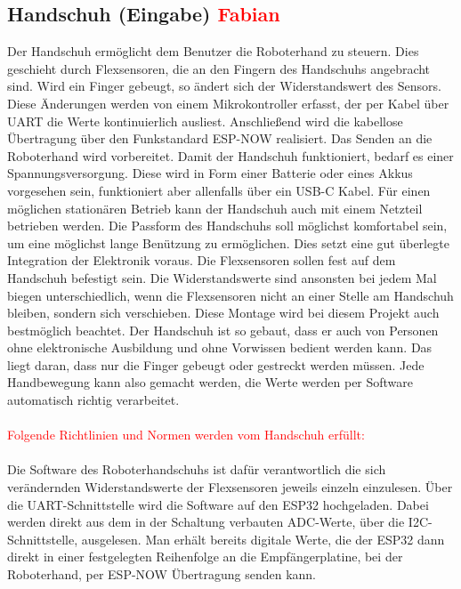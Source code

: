 \documentclass[11pt]{article}
\begin{document}
\subsection{Handschuh (Eingabe) \textcolor{red}{Fabian}}
Der Handschuh ermöglicht dem Benutzer die Roboterhand zu steuern. Dies geschieht durch Flexsensoren, die an den Fingern des 
Handschuhs angebracht sind. Wird ein Finger gebeugt, so ändert sich der Widerstandswert des Sensors. Diese Änderungen werden 
von einem Mikrokontroller erfasst, der per Kabel über UART die Werte kontinuierlich ausliest. Anschließend wird die kabellose 
Übertragung über den Funkstandard ESP-NOW realisiert. Das Senden an die Roboterhand wird vorbereitet. Damit der Handschuh 
funktioniert, bedarf es einer Spannungsversorgung. Diese wird in Form einer Batterie oder eines Akkus vorgesehen sein, 
funktioniert aber allenfalls über ein USB-C Kabel. Für einen möglichen stationären Betrieb kann der Handschuh auch mit einem 
Netzteil betrieben werden. Die Passform des Handschuhs soll möglichst komfortabel sein, um eine möglichst lange Benützung zu 
ermöglichen. Dies setzt eine gut überlegte Integration der Elektronik voraus. Die Flexsensoren sollen fest auf dem Handschuh 
befestigt sein. Die Widerstandswerte sind ansonsten bei jedem Mal biegen unterschiedlich, wenn die Flexsensoren nicht an einer 
Stelle am Handschuh bleiben, sondern sich verschieben. Diese Montage wird bei diesem Projekt auch bestmöglich beachtet. Der 
Handschuh ist so gebaut, dass er auch von Personen ohne elektronische Ausbildung und ohne Vorwissen bedient werden kann. Das 
liegt daran, dass nur die Finger gebeugt oder gestreckt werden müssen. Jede Handbewegung kann also gemacht werden, die Werte 
werden per Software automatisch richtig verarbeitet. \\
\\
\textcolor{red}{Folgende Richtlinien und Normen werden vom Handschuh erfüllt:}\\
\\
Die Software des Roboterhandschuhs ist dafür verantwortlich die sich verändernden Widerstandswerte der Flexsensoren 
jeweils einzeln einzulesen. Über die UART-Schnittstelle wird die Software auf den ESP32 hochgeladen. Dabei werden 
direkt aus dem in der Schaltung verbauten ADC-Werte, über die I2C-Schnittstelle, ausgelesen. Man erhält bereits digitale 
Werte, die der ESP32 dann direkt in einer festgelegten Reihenfolge an die Empfängerplatine, bei der Roboterhand, per 
ESP-NOW Übertragung senden kann.
\end{document}
